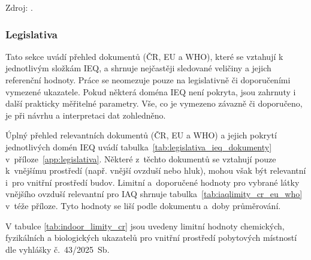 \begin{table}[!tbp]
\footnotesize Zdroj: \parencite{worldhealthorganizationWHOGlobalAir2021,osephg.allenAssociationsCognitiveFunction2016,calvoScalableIoTArchitecture2022,dengImpactIndoorAir2024,mcminnAWeightingMetric2013,marshIEC61672NewInternational2001}.
\end{table}

\FloatBarrier
\subsubsection{Legislativa}
Tato sekce uvádí přehled dokumentů (ČR, EU a WHO), které se vztahují k jednotlivým složkám IEQ, a shrnuje nejčastěji sledované veličiny a jejich referenční hodnoty. Práce se neomezuje pouze na legislativně či doporučeními vymezené ukazatele. Pokud některá doména IEQ není pokryta, jsou zahrnuty i další prakticky měřitelné parametry. Vše, co je vymezeno závazně či doporučeno, je při návrhu a interpretaci dat zohledněno.

Úplný přehled relevantních dokumentů (ČR, EU a WHO) a jejich pokrytí jednotlivých domén IEQ uvádí tabulka~\ref{tab:legislativa_ieq_dokumenty} v~příloze~\ref{app:legislativa}. Některé z~těchto dokumentů se vztahují pouze k~vnějšímu prostředí (např. vnější ovzduší nebo hluk), mohou však být relevantní i~pro vnitřní prostředí budov. Limitní a~doporučené hodnoty pro vybrané látky vnějšího ovzduší relevantní pro IAQ shrnuje tabulka~\ref{tab:iaqlimity_cr_eu_who} v~téže příloze. Tyto hodnoty se liší podle dokumentu a~doby průměrování.

V tabulce \ref{tab:indoor_limity_cr} jsou uvedeny limitní hodnoty chemických, fyzikálních a biologických ukazatelů pro vnitřní prostředí pobytových místností dle vyhlášky č.~43/2025~Sb.

